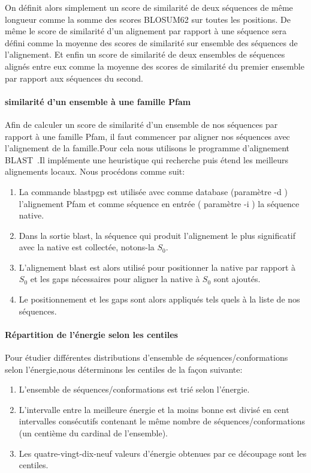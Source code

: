 On définit alors simplement un score de similarité de deux séquences de même longueur comme la somme des scores BLOSUM62 sur toutes les positions. De même le score de similarité d'un alignement par rapport à une séquence sera défini comme la moyenne des scores de similarité sur ensemble des séquences de l'alignement. Et enfin un score de similarité de deux ensembles de séquences alignés entre eux comme la moyenne des scores de similarité du premier ensemble par rapport aux séquences du second.  

\paragraph{similarité d'un ensemble à une famille Pfam}

Afin de calculer un score de similarité d'un ensemble de nos séquences par rapport à une famille Pfam, il faut commencer par aligner nos séquences avec l'alignement de la famille.Pour cela nous utilisons le programme d'alignement BLAST~\citep{refBLAST}.Il implémente une heuristique qui recherche puis étend les meilleurs alignements locaux. Nous procédons comme suit:
\begin{enumerate}
\item La commande blastpgp est utilisée avec comme database (paramètre -d ) l'alignement Pfam et comme séquence en entrée ( paramètre -i ) la séquence native. 
\item Dans la sortie blast, la séquence qui produit l'alignement le plus significatif avec la native est collectée, notons-la $S_0$. 
\item L'alignement blast est alors utilisé pour positionner la native par rapport à $S_0$ et les gaps nécessaires pour aligner la native à $S_0$ sont ajoutés.
\item Le positionnement et les gaps sont alors appliqués tels quels à la liste de nos séquences.

\end{enumerate}


\paragraph{Répartition de l'énergie selon les centiles }

Pour étudier différentes distributions d'ensemble de séquences/conformations selon l'énergie,nous déterminons les centiles de la façon suivante: 

\begin{enumerate}
\item L'ensemble de séquences/conformations est trié selon l'énergie.
\item L'intervalle entre la meilleure énergie et la moins bonne est divisé en cent intervalles consécutifs contenant le même nombre de séquences/conformations (un centième du cardinal de l'ensemble).
\item Les quatre-vingt-dix-neuf valeurs d'énergie obtenues par ce découpage sont les centiles.   
\end{enumerate}



